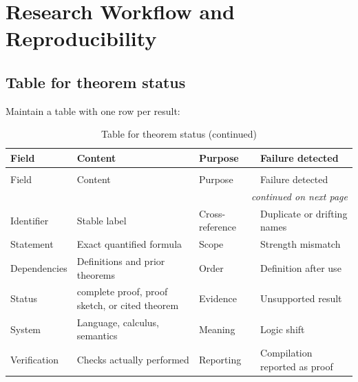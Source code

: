 \chapter{Research Workflow and Reproducibility}
\label{ch:research-workflow}

\section{Table for theorem status}
\label{sec:research-workflow-01}

Maintain a table with one row per result:
\begin{longtable}{@{}p{}p{}p{}p{}@{}}
\caption{Table for theorem status}\\
\toprule
Field & Content & Purpose & Failure detected \\
\midrule
\endfirsthead
\caption[]{Table for theorem status (continued)}\\
\toprule
Field & Content & Purpose & Failure detected \\
\midrule
\endhead
\midrule\multicolumn{4}{r}{\emph{continued on next page}}\\
\endfoot
\endlastfoot
Identifier & Stable label & Cross-reference & Duplicate or drifting names \\
Statement & Exact quantified formula & Scope & Strength mismatch \\
Dependencies & Definitions and prior theorems & Order & Definition after use \\
Status & complete proof, proof sketch, or cited theorem & Evidence & Unsupported result \\
System & Language, calculus, semantics & Meaning & Logic shift \\
Verification & Checks actually performed & Reporting & Compilation reported as proof \\
\bottomrule
\end{longtable}

